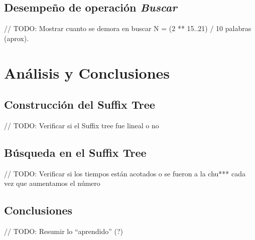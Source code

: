 \documentclass[letterpaper,10pt]{article}
\begin{document}
	\subsection{Desempeño de operación \textit{Buscar}}

	// TODO: Mostrar cuanto se demora en buscar N = (2 ** 15..21) / 10 palabras (aprox).

	\newpage

	\section{Análisis y Conclusiones}

	\subsection{Construcción del Suffix Tree}

	// TODO: Verificar si el Suffix tree fue lineal o no

	\subsection{Búsqueda en el Suffix Tree}

	// TODO: Verificar si los tiempos están acotados o se fueron a la chu*** cada vez que aumentamos el número

	\subsection{Conclusiones}

	// TODO: Resumir lo ``aprendido'' (?)
\end{document}
